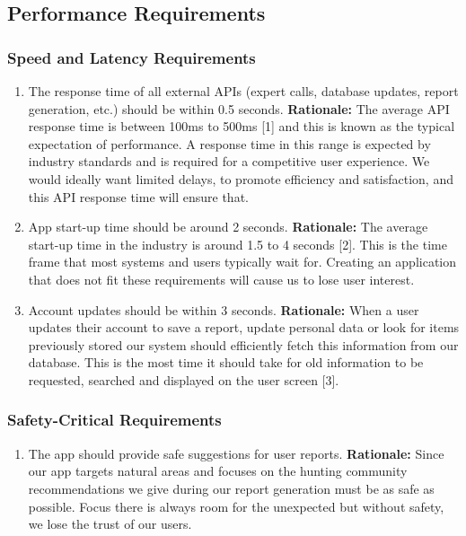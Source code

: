 \documentclass[]{article}
\begin{document}

\subsection{Performance Requirements}
\label{sub:performance_requirements}

\subsubsection{Speed and Latency Requirements}
\label{ssub:speed_and_latency_requirements}
\begin{enumerate}[{PR-SL}1. ]
	\item The response time of all external APIs (expert calls, database updates, report generation, etc.) should be within 0.5 seconds.
	\textbf{Rationale:} The average API response time is between 100ms to 500ms [1] and this is known as the typical expectation of performance. A response time in this range is expected by industry standards and is required for a competitive user experience. We would ideally want limited delays, to promote efficiency and satisfaction, and this API response time will ensure that. 
	\item App start-up time should be around 2 seconds.
	\textbf{Rationale:} The average start-up time in the industry is around 1.5 to 4 seconds [2]. This is the time frame that most systems and users typically wait for. Creating an application that does not fit these requirements will cause us to lose user interest. 
	\item Account updates should be within 3 seconds.
	\textbf{Rationale:} When a user updates their account to save a report, update personal data or look for items previously stored our system should efficiently fetch this information from our database. This is the most time it should take for old information to be requested, searched and displayed on the user screen [3].
\end{enumerate}

\subsubsection{Safety-Critical Requirements}
\label{ssub:safety_critical_requirements}
\begin{enumerate}[{PR-SC}1. ]
	\item The app should provide safe suggestions for user reports.
	\textbf{Rationale:} Since our app targets natural areas and focuses on the hunting community recommendations we give during our report generation must be as safe as possible. Focus there is always room for the unexpected but without safety, we lose the trust of our users.
\end{enumerate}
\end{document}
